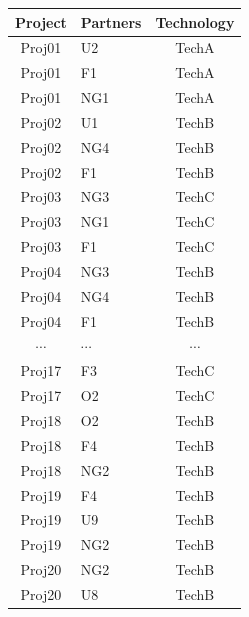 \documentclass[8pt]{beamer}
\begin{document}
\begin{frame}[fragile]
\begin{columns}[c]
\begin{minipage}[c][.5\textheight][c]{\linewidth}
{\scriptsize
\begin{table}
\begin{tabular}{clc}
\bottomrule
Project & Partners & Technology \\
\hline
Proj01     & U2       & TechA     \\
Proj01     & F1       & TechA     \\
Proj01     & NG1      & TechA     \\
Proj02     & U1       & TechB     \\
Proj02     & NG4      & TechB     \\
Proj02     & F1       & TechB     \\
Proj03     & NG3      & TechC     \\
Proj03     & NG1      & TechC     \\
Proj03     & F1       & TechC     \\
Proj04     & NG3      & TechB     \\
Proj04     & NG4      & TechB     \\
Proj04     & F1       & TechB     \\
$\cdots$& $\cdots$ & $\cdots$     \\
Proj17    & F3       & TechC      \\
Proj17    & O2       & TechC      \\
Proj18    & O2       & TechB      \\
Proj18    & F4       & TechB      \\
Proj18    & NG2      & TechB      \\
Proj19    & F4       & TechB      \\
Proj19    & U9       & TechB      \\
Proj19    & NG2      & TechB      \\
Proj20    & NG2      & TechB      \\
Proj20    & U8       & TechB      \\
\bottomrule     
\end{tabular}
\end{table}}



\end{minipage}
\end{columns}
\end{frame}
\end{document}
